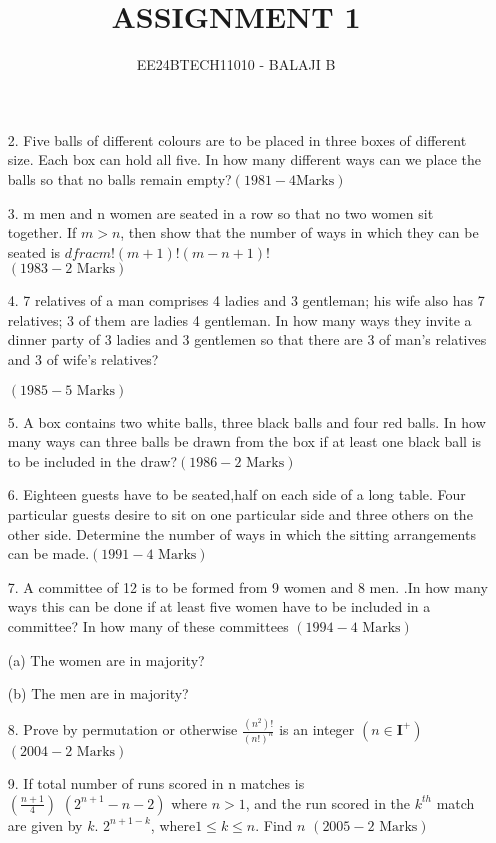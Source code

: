 \documentclass[journal,12pt,twocolumn]{IEEEtran}
\theoremstyle{remark}
\begin{document}

\vspace{3cm}

\title{ASSIGNMENT 1}
\author{EE24BTECH11010 - BALAJI B}
\maketitle
\newpage
\bigskip

\renewcommand{\thefigure}{\theenumi}
\renewcommand{\thetable}{\theenumi}
\begin{enumerate}
    \item[2.] Five balls of different colours are to be placed in three boxes of different size. Each box can hold all five. In how many different ways can we place the balls so that no balls remain empty?\hfill $(1981- 4 \text{Marks})$
    \item[3.] m men and n women are seated in a row so that no two women sit together. If $m>n$, then show that the number of ways in which they can be seated is $dfrac{m!(m+1)!}{(m-n+1)!}$ \\

    \hfill$(1983-2\text{ Marks})$
    \item[4.] 7 relatives of a man comprises 4 ladies and 3 gentleman; his wife also has 7 relatives; 3 of them are ladies 4 gentleman. In how many ways they invite a dinner party of 3 ladies and 3 gentlemen so that there are 3 of man's relatives and 3 of wife's relatives?
    
    \hfill$(1985- 5 \text{ Marks})$
    \item[5.]A box contains two white balls, three black balls and four red balls. In how many ways can three balls be drawn from the box if at least one black ball is to be included in the draw?\hfill$(1986-2\text{ Marks})$  
    \item[6.] Eighteen guests have to be seated,half on each side of a long table. Four particular guests desire to sit on one particular side and three others on the other side. Determine the number of ways in which the sitting arrangements can be made.\hfill$(1991-4\text{ Marks})$
    \item[7.]A committee of 12 is to be formed from 9 women and 8 men. .In how many ways this can be done if at least five women have to be included in a committee? In how many of these committees \hfill $(1994- 4 \text{ Marks})$

    (a) The women are in majority?
    
    (b) The men are in majority?
    
    \item[8. ] Prove by permutation or otherwise $\frac{(n^2)!}{(n!)^n}$ is an integer $(n\in \mathbf{I}^+) $\hfill $(2004-2\text{ Marks})$  
     \item[9. ] If total number of runs scored in n matches is\\
     
     $\left(\frac{n+1}{4}\right)$ $(2^{n+1}-n-2)$ where $n>1$, and the run scored in the $k^{th}$ match are given by $k$. $2^{n+1-k}$, where$ 1 \leq k \leq n$. Find $n$ \hfill $(2005- 2 \text{ Marks})$
     
    \end{enumerate}
\end{document}
